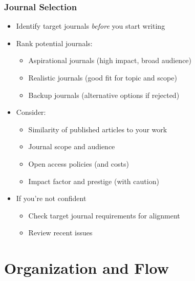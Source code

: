 \documentclass{beamer}
\begin{document}
\begin{frame}
  \frametitle{Journal Selection}
  \begin{itemize}
    \item Identify target journals \emph{before} you start writing
    \item Rank potential journals:
    \begin{itemize}
      \item Aspirational journals (high impact, broad audience)
      \item Realistic journals (good fit for topic and scope)
      \item Backup journals (alternative options if rejected)
    \end{itemize}
    \item Consider:
    \begin{itemize}
      \item Similarity of published articles to your work
      \item Journal scope and audience
      \item {\tiny Open access policies (and costs)}
      \item {\tiny Impact factor and prestige (with caution)}
    \end{itemize}
    \item If you're not confident
    \begin{itemize}
      \item Check target journal requirements for alignment
      \item Review recent issues
    \end{itemize}
    \end{itemize}
\end{frame}

\section{Organization and Flow}
\end{document}
